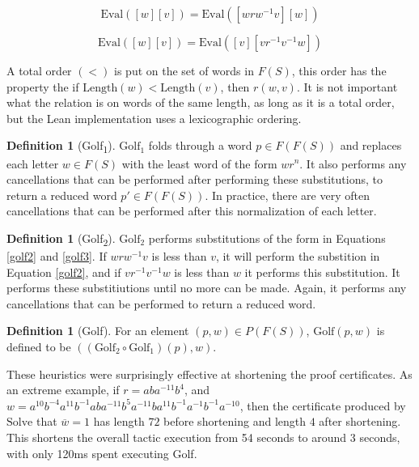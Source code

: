 \documentclass[11pt]{article} %
\theoremstyle{definition}
\theoremstyle{definition}
\theoremstyle{definition}
\theoremstyle{definition}
\theoremstyle{definition}
\newtheorem{defn}[theorem]{Definition}
\theoremstyle{definition}
\begin{document}
\begin{equation}\label{golf2}
  \text{Eval}([w][v]) = \text{Eval}([wrw^{-1}v][w])
\end{equation}

\begin{equation}\label{golf3}
  \text{Eval}([w][v]) = \text{Eval}([v][vr^{-1}v^{-1}w])
\end{equation}

A total order $(<)$ is put on the set of words in $F(S)$, this order has
the property the if $\text{Length}(w) < \text{Length}(v)$, then
$r(w,v)$. It is not important what the relation is on words of the same length,
as long as it is a total order, but the Lean implementation uses a lexicographic ordering.

\begin{defn}[Golf\textsubscript{1}]
$\text{Golf}_1$ folds through a word $p \in F(F(S))$ and replaces each
letter $w \in F(S)$ with the least word of the form $wr^n$.
It also performs any cancellations that can be performed after
performing these substitutions, to return a reduced word $p' \in F(F(S))$.
In practice, there are very often cancellations
that can be performed after this normalization of each letter.
\end{defn}

\begin{defn}[Golf\textsubscript{2}]
  $\text{Golf}_2$ performs substitutions of the form in Equations \ref{golf2} and
  \ref{golf3}. If $wrw^{-1}v$ is less than $v$, it will perform the substition
  in Equation \ref{golf2}, and if $vr^{-1}v^{-1}w$ is less than $w$ it performs
  this substitution. It performs these substitiutions until no more can be made.
  Again, it performs any cancellations that can be performed to return
  a reduced word.
\end{defn}

\begin{defn}[Golf]
  For an element $(p, w) \in P(F(S))$, $\text{Golf}(p, w)$ is defined to be
  $((\text{Golf}_2 \circ \text{Golf}_1)(p), w)$.
\end{defn}

These heuristics were surprisingly effective at shortening the proof certificates.
As an extreme example, if $r = aba^{-11}b^4$, and
$w = a^{10}b^{-4}a^{11}b^{-1}ab a^{-11} b^5a^{-11}b a^{11}b^{-1}a^{-1}b^{-1}a^{-10}$,
then the certificate produced by $\text{Solve}$ that $\overline{w} =1$
 has length $72$ before shortening and length $4$ after shortening.
 This shortens the overall tactic execution from 54 seconds to around
 3 seconds, with only 120ms spent executing Golf.
\end{document}
